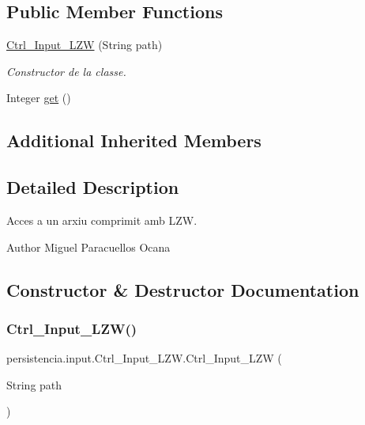 \subsection*{Public Member Functions}
\begin{DoxyCompactItemize}
\item 
\hyperlink{classpersistencia_1_1input_1_1Ctrl__Input__LZW_a31503f303ac443e110379322e851791a}{Ctrl\+\_\+\+Input\+\_\+\+L\+ZW} (String path)
\begin{DoxyCompactList}\small\item\em Constructor de la classe. \end{DoxyCompactList}\item 
Integer \hyperlink{classpersistencia_1_1input_1_1Ctrl__Input__LZW_a821592197863ec1b1f052a794753ea40}{get} ()
\end{DoxyCompactItemize}
\subsection*{Additional Inherited Members}


\subsection{Detailed Description}
Acces a un arxiu comprimit amb L\+ZW. 

\begin{DoxyAuthor}{Author}
Miguel Paracuellos Ocana 
\end{DoxyAuthor}


\subsection{Constructor \& Destructor Documentation}
\mbox{\label{classpersistencia_1_1input_1_1Ctrl__Input__LZW_a31503f303ac443e110379322e851791a}} 
\subsubsection{\texorpdfstring{Ctrl\+\_\+\+Input\+\_\+\+L\+Z\+W()}{Ctrl\_Input\_LZW()}}
{\footnotesize\ttfamily persistencia.\+input.\+Ctrl\+\_\+\+Input\+\_\+\+L\+Z\+W.\+Ctrl\+\_\+\+Input\+\_\+\+L\+ZW (\begin{DoxyParamCaption}\item[{String}]{path }\end{DoxyParamCaption})\hspace{0.3cm}{\ttfamily [inline]}}



